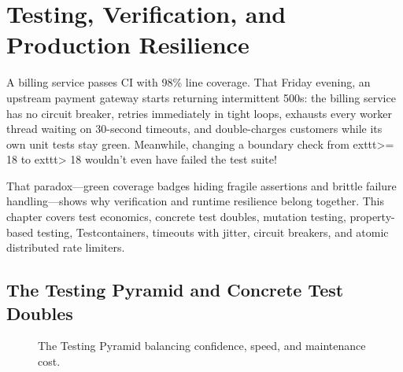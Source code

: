 \chapter{Testing, Verification, and Production Resilience}
\label{chap:testing}

A billing service passes CI with 98\% line coverage. That Friday evening, an upstream payment gateway starts returning intermittent 500s: the billing service has no circuit breaker, retries immediately in tight loops, exhausts every worker thread waiting on 30-second timeouts, and double-charges customers while its own unit tests stay green. Meanwhile, changing a boundary check from 	exttt{>= 18} to 	exttt{> 18} wouldn't even have failed the test suite!

That paradox---green coverage badges hiding fragile assertions and brittle failure handling---shows why verification and runtime resilience belong together. This chapter covers test economics, concrete test doubles, mutation testing, property-based testing, Testcontainers, timeouts with jitter, circuit breakers, and atomic distributed rate limiters.

\section{The Testing Pyramid and Concrete Test Doubles}

\begin{figure}[htbp]
\centering
{}
\caption{The Testing Pyramid balancing confidence, speed, and maintenance cost.}
\label{fig:v1-ch07-testing-pyramid}
\end{figure}

